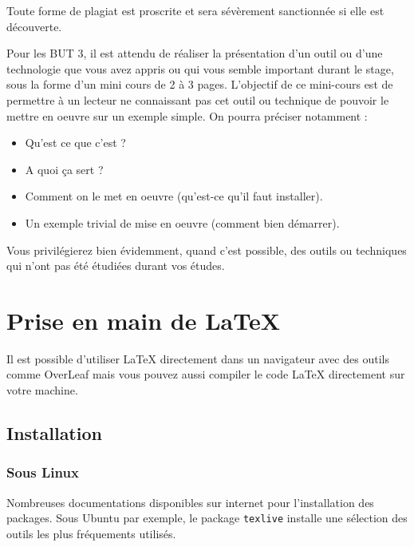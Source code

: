 \documentclass[12pt,oneside,noprintercorrection]{iut}
\begin{document}
\begin{aide}{}{}
Toute forme de plagiat est proscrite et sera sévèrement sanctionnée si elle est découverte.
\end{aide}

\begin{aide}{}{}
  Pour les BUT 3, il est attendu de réaliser la présentation d'un outil ou d'une technologie que vous avez appris ou qui vous semble important durant le
  stage, sous la forme d'un mini cours de 2 à 3 pages.
  L'objectif de ce mini-cours est de permettre à un lecteur ne connaissant pas cet outil ou technique de pouvoir le mettre en oeuvre sur un exemple simple. On pourra préciser notamment :
  \begin{itemize}
  \item Qu'est ce que c'est ?
  \item A quoi ça sert ?
  \item Comment on le met en oeuvre (qu'est-ce qu'il faut installer).
  \item Un exemple trivial de mise en oeuvre (comment bien démarrer).
  \end{itemize}
  Vous privilégierez bien évidemment, quand c'est possible, des outils ou techniques qui n'ont pas été étudiées durant vos études.
\end{aide}

\NoChapterHead


\chapter{Prise en main de \LaTeX}

Il est possible d'utiliser {\LaTeX} directement dans un navigateur avec des outils comme OverLeaf mais vous pouvez aussi compiler le code {\LaTeX} directement sur votre machine.

\section{Installation}

\subsection{Sous Linux}
Nombreuses documentations disponibles sur internet pour
l'installation des packages. Sous {\sc Ubuntu} par exemple, 
le package {\tt texlive} installe une sélection des outils les 
plus fréquements utilisés.
\end{document}
